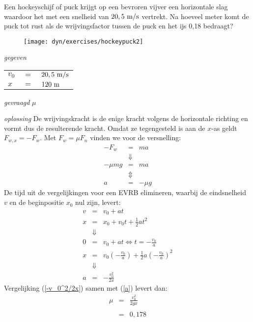 
\begin{exercise}

 Een hockeyschijf of puck krijgt op een bevroren vijver een horizontale slag waardoor het met een snelheid van $20,5~\rm m/s$ vertrekt. Na hoeveel meter komt de puck tot rust als de wrijvingsfactor tussen de puck en het ijs 0,18 bedraagt? %
\begin{oplossing}
\begin{figure}[h]
\begin{center}
\texttt{[image: dyn/exercises/hockeypuck2]}
\end{center}
\end{figure}

\textit{gegeven}
\begin{tabular}[t]{lcl}
$v_0$ &$=$& $20,5~\rm m/s$\\
$x$ &$=$& $120~\rm m$\\
\end{tabular}

\textit{gevraagd}
$\mu$

\textit{oplossing}
De wrijvingskracht is de enige kracht volgens de horizontale
richting en vormt dus de resulterende kracht. Omdat ze tegengesteld
is aan de $x$-as geldt $F_{w,x}=-F_w$. Met $F_w=\mu F_n$ vinden we
voor de versnelling:
\begin{eqnarray}
-F_w &=& ma\nonumber\\
&\Downarrow& \nonumber\\
-\mu mg &=&ma\nonumber\\
&\Updownarrow& \nonumber\\
a &=& -\mu g\label{a}
\end{eqnarray}
De tijd uit de vergelijkingen voor een EVRB elimineren, waarbij de
eindsnelheid $v$ en de beginpositie $x_0$ nul zijn, levert:
\begin{eqnarray}
v&=&v_0+at\nonumber\\
x&=&x_0+v_0t+\frac{1}{2}at^2\nonumber\\
&\Downarrow&\nonumber\\
0&=&v_0+at\Leftrightarrow t=-\frac{v_0}{a}\nonumber\\
x&=&v_0\left(-\frac{v_0}{a}\right)+\frac{1}{2}a\left(-\frac{v_0}{a}\right)^2\nonumber\\
&\Downarrow&\nonumber\\
a&=&-\frac{v_0^2}{2x}\label{-v_0^2/2x}
\end{eqnarray}
Vergelijking (\ref{-v_0^2/2x}) samen met (\ref{a}) levert dan:
\begin{eqnarray}
\mu &=& \frac{v_0^2}{2gx}\label{remvgl}\\
&&\nonumber\\
&=& 0,178\nonumber
\end{eqnarray}
\end{oplossing}

\end{exercise}
